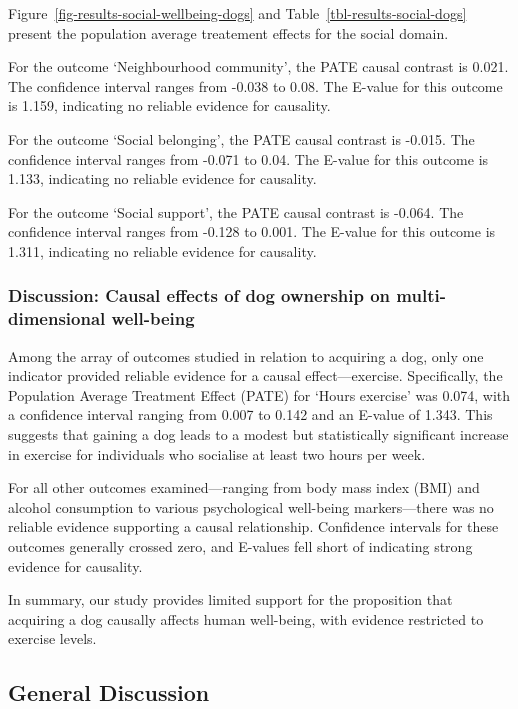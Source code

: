 \documentclass[
  singlecolumn,
  9pt]{article}
\begin{document}
Figure~\ref{fig-results-social-wellbeing-dogs} and
Table~\ref{tbl-results-social-dogs} present the population average
treatement effects for the social domain.

For the outcome `Neighbourhood community', the PATE causal contrast is
0.021. The confidence interval ranges from -0.038 to 0.08. The E-value
for this outcome is 1.159, indicating no reliable evidence for
causality.

For the outcome `Social belonging', the PATE causal contrast is -0.015.
The confidence interval ranges from -0.071 to 0.04. The E-value for this
outcome is 1.133, indicating no reliable evidence for causality.

For the outcome `Social support', the PATE causal contrast is -0.064.
The confidence interval ranges from -0.128 to 0.001. The E-value for
this outcome is 1.311, indicating no reliable evidence for causality.

\subsubsection{Discussion: Causal effects of dog ownership on
multi-dimensional
well-being}\label{discussion-causal-effects-of-dog-ownership-on-multi-dimensional-well-being}

Among the array of outcomes studied in relation to acquiring a dog, only
one indicator provided reliable evidence for a causal effect---exercise.
Specifically, the Population Average Treatment Effect (PATE) for `Hours
exercise' was 0.074, with a confidence interval ranging from 0.007 to
0.142 and an E-value of 1.343. This suggests that gaining a dog leads to
a modest but statistically significant increase in exercise for
individuals who socialise at least two hours per week.

For all other outcomes examined---ranging from body mass index (BMI) and
alcohol consumption to various psychological well-being markers---there
was no reliable evidence supporting a causal relationship. Confidence
intervals for these outcomes generally crossed zero, and E-values fell
short of indicating strong evidence for causality.

In summary, our study provides limited support for the proposition that
acquiring a dog causally affects human well-being, with evidence
restricted to exercise levels.

\subsection{General Discussion}\label{general-discussion}
\end{document}
